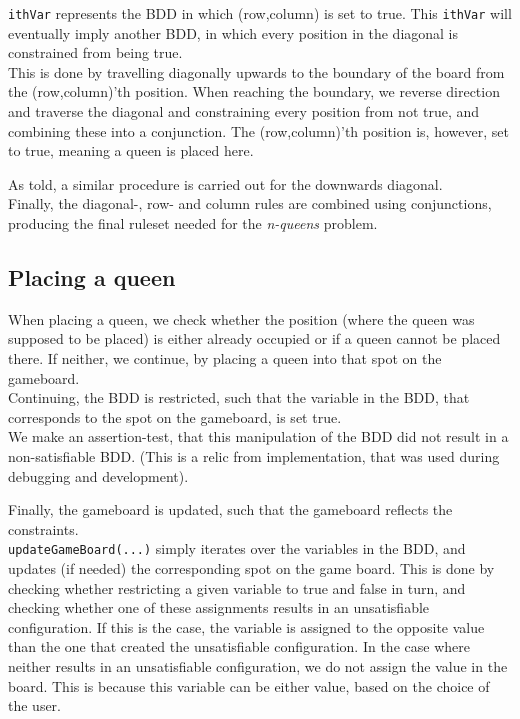\texttt{ithVar} represents the BDD in which (row,column) is set to true. This \texttt{ithVar} will eventually imply another BDD, in which every position in the diagonal is constrained from being true. \\
This is done by travelling diagonally upwards to the boundary of the board from the (row,column)'th position. When reaching the boundary, we reverse direction and traverse the diagonal and constraining every position from not true, and combining these into a conjunction. The  (row,column)'th position is, however, set to true, meaning a queen is placed here.

As told, a similar procedure is carried out for the downwards diagonal. \\

Finally, the diagonal-, row- and column rules are combined using conjunctions, producing the final ruleset needed for the \textit{n-queens} problem. 

\subsection{Placing a queen}
When placing a queen, we check whether the position (where the queen was supposed to be placed) is either already occupied or if a queen cannot be placed there. If neither, we continue, by placing a queen into that spot on the gameboard. \\

Continuing, the BDD is restricted, such that the variable in the BDD, that corresponds to the spot on the gameboard, is set true. \\

We make an assertion-test, that this manipulation of the BDD did not result in a non-satisfiable BDD. (This is a relic from implementation, that was used during debugging and development). 

Finally, the gameboard is updated, such that the gameboard reflects the constraints. \\

\texttt{updateGameBoard(...)} simply iterates over the variables in the BDD, and updates (if needed) the corresponding spot on the game board. This is done by checking whether restricting a given variable to true and false in turn, and checking whether one of these assignments results in an unsatisfiable configuration. If this is the case, the variable is assigned to the opposite value than the one that created the unsatisfiable configuration. In the case where neither results in an unsatisfiable configuration, we do not assign the value in the board. This is because this variable can be either value, based on the choice of the user. \\


